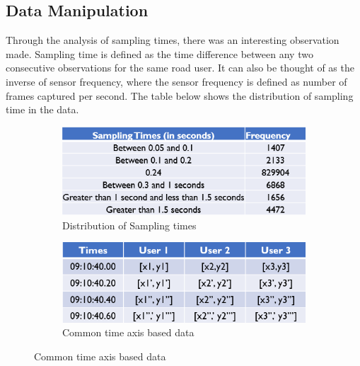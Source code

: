 \documentclass{article}
\begin{document}
\subsection{Data Manipulation}
Through the analysis of sampling times, there was an interesting observation made. Sampling time is defined as the time difference between any two consecutive observations for the same road user. It can also be thought of as the inverse of sensor frequency, where the sensor frequency is defined as number of frames captured per second. The table below shows the distribution of sampling time in the data.
\begin{figure}[H]
\centering
\begin{subfigure}{0.5\textwidth}
  \centering
  \includegraphics[width=.8\linewidth]{data/tab1.png}
  \caption{ Distribution of Sampling times}
  \label{fig:sampling_time}
\end{subfigure}%
\begin{subfigure}{0.5\textwidth}
  \centering
  \includegraphics[width=.8\linewidth]{data/tab2.png}
  \caption{Common time axis based data}
  \label{fig:common_axis_data}
\end{subfigure}
\label{fig:sampling}
\end{figure}
\end{document}
